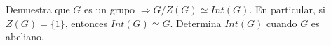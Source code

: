 \question
Demuestra que $G$ es un grupo $\Rightarrow {G/Z(G) \simeq Int(G)}$. En particular, si $Z(G) = \{1\}$, entonces $Int(G) \simeq G$. Determina $Int(G)$ cuando $G$ es abeliano.